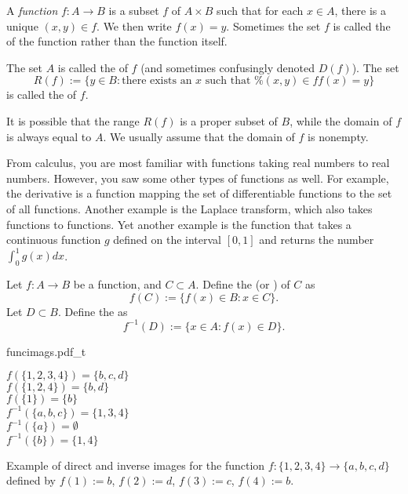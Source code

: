 \begin{defn}
A \emph{function} $f \colon A \to B$ is a subset $f$ of $A \times B$
such that for each $x \in A$, there is a unique $(x,y) \in f$.  We then
write $f(x) = y$.  Sometimes
the set $f$ is called the \emph{} of the function rather than
the function itself.

The set $A$ is called the \emph{} of $f$ (and
sometimes confusingly denoted $D(f)$).  The set
\begin{equation*}
R(f) := \{ y \in B : \text{there exists an $x$ such that
$f(x)=y$
} \}
\end{equation*}
is called the \emph{} of $f$.
\end{defn}

It is possible that the range $R(f)$ is a proper subset of $B$,
while the domain of $f$ is always equal to $A$.  We usually 
assume that the domain of $f$ is nonempty.

\begin{example}
From calculus, you are most familiar with functions taking real numbers to real
numbers.  However, you saw some other types of functions as well.  For
example, the derivative is a function mapping the set of
differentiable functions to the set of all functions.
Another example is the Laplace transform, which also
takes functions to functions.  Yet another example is the function that takes
a continuous function $g$ defined on the interval $[0,1]$ and returns the
number $\int_0^1 g(x) dx$.
\end{example}

\begin{defn}
Let $f \colon A \to B$ be a function, and $C \subset A$.  Define
the \emph{} (or \emph{}) of $C$ as
\begin{equation*}
f(C) := \{ f(x) \in B : x \in C \} .
\end{equation*}
Let $D \subset B$.  Define the \emph{} as
\begin{equation*}
f^{-1}(D) := \{ x \in A : f(x) \in D \} .
\end{equation*}
\end{defn}
\begin{myfigureht}
\parbox{2.5in}{{funcimags.pdf_t}}
\parbox{2in}{%
$f(\{1,2,3,4\}) = \{ b, c, d \}$\\[3pt]
$f(\{1,2,4\}) = \{ b, d \}$\\[3pt]
$f(\{1\}) = \{ b \}$\\[3pt]
$f^{-1}(\{a,b,c\}) = \{ 1, 3, 4 \}$\\[3pt]
$f^{-1}(\{a\}) = \emptyset$\\[3pt]
$f^{-1}(\{b\}) = \{ 1, 4 \}$
}
\caption{Example of direct and inverse images for the function $f \colon \{ 1,2,3,4 \} \to \{
a,b,c,d \}$ defined by
$f(1) := b$,
$f(2) := d$,
$f(3) := c$,
$f(4) := b$.\label{figfuncimags}}
\end{myfigureht}

